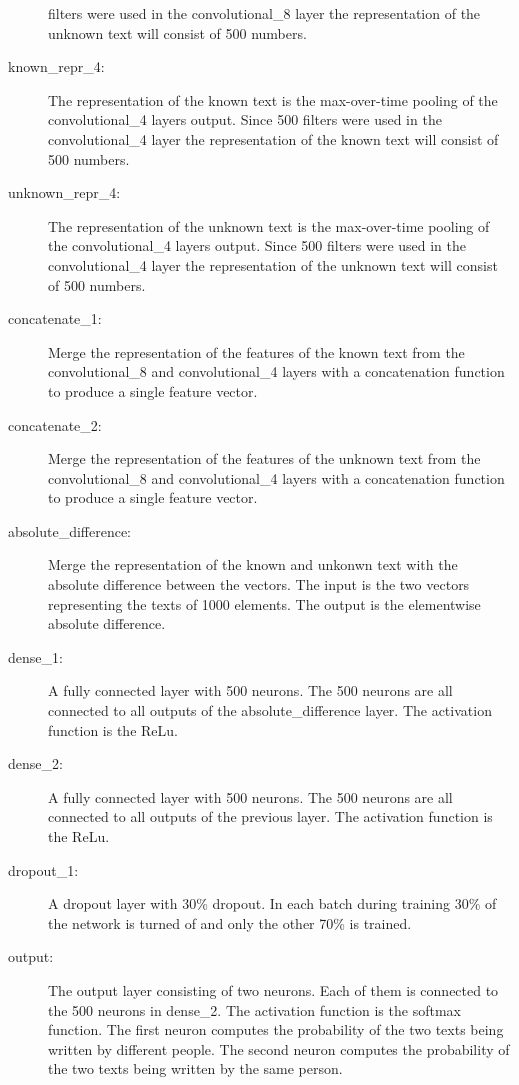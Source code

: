 \begin{description}
        filters were used in the convolutional\_8 layer the representation of
        the unknown text will consist of 500 numbers.
    \item[known\_repr\_4:] The representation of the known text is the
        max-over-time pooling of the convolutional\_4 layers output. Since 500
        filters were used in the convolutional\_4 layer the representation of
        the known text will consist of 500 numbers.
    \item[unknown\_repr\_4:] The representation of the unknown text is the
        max-over-time pooling of the convolutional\_4 layers output. Since 500
        filters were used in the convolutional\_4 layer the representation of
        the unknown text will consist of 500 numbers.
    \item[concatenate\_1:] Merge the representation of the features of the known
        text from the convolutional\_8 and convolutional\_4 layers with a
        concatenation function to produce a single feature vector.
    \item[concatenate\_2:] Merge the representation of the features of the
        unknown text from the convolutional\_8 and convolutional\_4 layers with
        a concatenation function to produce a single feature vector.
    \item[absolute\_difference:] Merge the representation of the known and
        unkonwn text with the absolute difference between the vectors. The input
        is the two vectors representing the texts of 1000 elements. The output
        is the elementwise absolute difference.
    \item[dense\_1:] A fully connected layer with 500 neurons. The 500 neurons
        are all connected to all outputs of the absolute\_difference layer. The
        activation function is the \gls{ReLu}.
    \item[dense\_2:] A fully connected layer with 500 neurons. The 500 neurons
        are all connected to all outputs of the previous layer. The
        activation function is the \gls{ReLu}.
    \item[dropout\_1:] A dropout layer with 30\% dropout. In each batch during
        training 30\% of the network is turned of and only the other 70\% is
        trained.
    \item[output:] The output layer consisting of two neurons. Each of them is
        connected to the 500 neurons in dense\_2. The activation function is the
        softmax function. The first neuron computes the probability of the two
        texts being written by different people. The second neuron computes the
        probability of the two texts being written by the same person.
\end{description}

